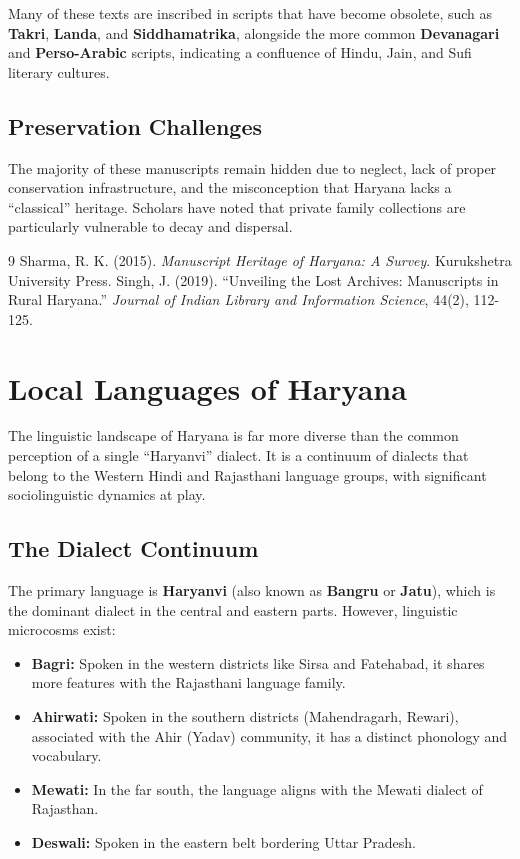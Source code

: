 \documentclass[12pt]{article}
\begin{document}
Many of these texts are inscribed in scripts that have become obsolete, such as \textbf{Takri}, \textbf{Landa}, and \textbf{Siddhamatrika}, alongside the more common \textbf{Devanagari} and \textbf{Perso-Arabic} scripts, indicating a confluence of Hindu, Jain, and Sufi literary cultures.

\subsection{Preservation Challenges}
The majority of these manuscripts remain hidden due to neglect, lack of proper conservation infrastructure, and the misconception that Haryana lacks a ``classical'' heritage. Scholars have noted that private family collections are particularly vulnerable to decay and dispersal.

\begin{thebibliography}{9}
 Sharma, R. K. (2015). \textit{Manuscript Heritage of Haryana: A Survey}. Kurukshetra University Press.
 Singh, J. (2019). ``Unveiling the Lost Archives: Manuscripts in Rural Haryana.'' \textit{Journal of Indian Library and Information Science}, 44(2), 112-125.
\end{thebibliography}

\section{Local Languages of Haryana}
The linguistic landscape of Haryana is far more diverse than the common perception of a single ``Haryanvi'' dialect. It is a continuum of dialects that belong to the Western Hindi and Rajasthani language groups, with significant sociolinguistic dynamics at play.

\subsection{The Dialect Continuum}
The primary language is \textbf{Haryanvi} (also known as \textbf{Bangru} or \textbf{Jatu}), which is the dominant dialect in the central and eastern parts. However, linguistic microcosms exist:
\begin{itemize}
    \item \textbf{Bagri:} Spoken in the western districts like Sirsa and Fatehabad, it shares more features with the Rajasthani language family.
    \item \textbf{Ahirwati:} Spoken in the southern districts (Mahendragarh, Rewari), associated with the Ahir (Yadav) community, it has a distinct phonology and vocabulary.
    \item \textbf{Mewati:} In the far south, the language aligns with the Mewati dialect of Rajasthan.
    \item \textbf{Deswali:} Spoken in the eastern belt bordering Uttar Pradesh.
\end{itemize}
\end{document}
